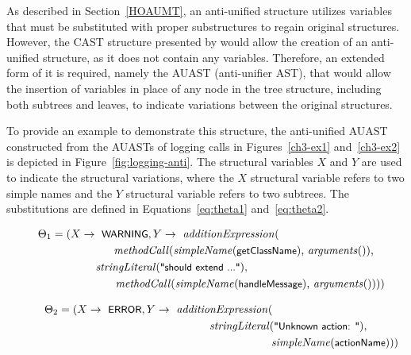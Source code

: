 As described in Section~\ref{HOAUMT}, an anti-unified structure utilizes variables that must be substituted with proper substructures to regain original structures. However, the CAST structure presented by \citet{2008:fse:cottrell} would allow the creation of an anti-unified structure, as it does not contain any variables. Therefore, an extended form of it is required, namely the AUAST (anti-unifier AST), that would allow the insertion of variables in place of any node in the tree structure, including both subtrees and leaves, to indicate variations between the original structures. 

To provide an example to demonstrate this structure, the anti-unified AUAST constructed from the AUASTs of logging calls in Figures~\ref{ch3-ex1} and~\ref{ch3-ex2} is depicted in Figure~\ref{fig:logging-anti}. The structural variables $X$ and $Y$ are used to indicate the structural variations, where the $X$ structural variable refers to two simple names and the $Y$ structural variable refers to two subtrees. The substitutions are defined in Equations~\ref{eq:theta1} and~\ref{eq:theta2}.


\begin{align}
\Theta_1 = (X \rightarrow \text{ \textsf{\small WARNING}}, Y \rightarrow \text{ \textit{additionExpression}(}\hspace*{3cm}\nonumber\\
\text{\textit{methodCall}(\textit{simpleName}(\textsf{\small getClassName}), \textit{arguments}()),}\nonumber\\
\text{\textit{stringLiteral}(\textsf{\small "should extend ..."}),}\hspace*{4cm}\nonumber\\
\text{\textit{methodCall}(\textit{simpleName}(\textsf{\small handleMessage}), \textit{arguments}()))})\hspace*{-1em}\label{eq:theta1}
\end{align}

\begin{align}
\Theta_2 = (X \rightarrow \text{ \textsf{\small ERROR}}, Y \rightarrow \text{ \textit{additionExpression}(}\hspace*{3cm}\nonumber\\
\text{\textit{stringLiteral}(\textsf{\small "Unknown action: "})},\nonumber\\
\text{ \textit{simpleName}(\textsf{\small actionName}))})\hspace*{-1cm}\label{eq:theta2}
\end{align}

